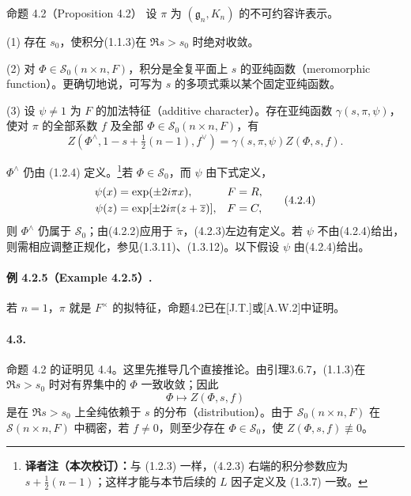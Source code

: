 \begin{originaltheorem}{命题 4.2（Proposition 4.2）}
设 $\pi$ 为 $(\mathfrak g_n,K_n)$ 的不可约容许表示。

(1) 存在 $s_0$，使积分(1.1.3)在 $\Re s>s_0$ 时绝对收敛。

(2) 对 $\Phi\in\mathcal S_0(n\times n,F)$，积分是全复平面上 $s$ 的亚纯函数（meromorphic function）。更确切地说，可写为 $s$ 的多项式乘以某个固定亚纯函数。

(3) 设 $\psi\ne1$ 为 $F$ 的加法特征（additive character）。存在亚纯函数 $\gamma(s,\pi,\psi)$，使对 $\pi$ 的全部系数 $f$ 及全部 $\Phi\in\mathcal S_0(n\times n,F)$，有
\[
 Z(\Phi^\wedge,1-s+\tfrac12(n-1),f^\vee)
 =\gamma(s,\pi,\psi)Z(\Phi,s,f).\tag{4.2.3}
\]
\end{originaltheorem}
$\Phi^\wedge$ 仍由 (1.2.4) 定义。\footnote{\textbf{译者注（本次校订）：}与 (1.2.3) 一样，(4.2.3) 右端的积分参数应为 $s+\tfrac12(n-1)$；这样才能与本节后续的 $L$ 因子定义及 (1.3.7) 一致。}若 $\Phi\in\mathcal S_0$，而 $\psi$ 由下式定义，
\[
\begin{aligned}
 \psi(x)&=\exp(\pm2i\pi x),&&F=R,\\
 \psi(z)&=\exp[\pm2i\pi(z+\overline z)],&&F=C,
\end{aligned}\tag{4.2.4}
\]
则 $\Phi^\wedge$ 仍属于 $\mathcal S_0$；由(4.2.2)应用于 $\widetilde\pi$，(4.2.3)左边有定义。若 $\psi$ 不由(4.2.4)给出，则需相应调整正规化，参见(1.3.11)、(1.3.12)。以下假设 $\psi$ 由(4.2.4)给出。

\paragraph*{例 4.2.5（Example 4.2.5）.}
若 $n=1$，$\pi$ 就是 $F^\times$ 的拟特征，命题4.2已在[J.T.]或[A.W.2]中证明。

\paragraph*{4.3.}
命题 4.2 的证明见 4.4。这里先推导几个直接推论。由引理3.6.7，(1.1.3)在 $\Re s>s_0$ 时对有界集中的 $\Phi$ 一致收敛；因此
\[
 \Phi\longmapsto Z(\Phi,s,f)\tag{4.3.1}
\]
是在 $\Re s>s_0$ 上全纯依赖于 $s$ 的分布（distribution）。由于 $\mathcal S_0(n\times n,F)$ 在 $\mathcal S(n\times n,F)$ 中稠密，若 $f\ne0$，则至少存在 $\Phi\in\mathcal S_0$，使 $Z(\Phi,s,f)\not\equiv0$。

